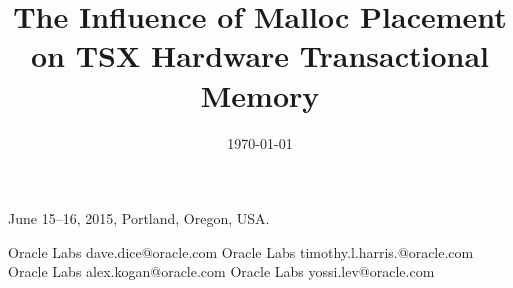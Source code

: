 \documentclass[preprint]{sigplanconf}
\begin{document}
\setlength{\pdfpageheight}{\paperheight}                                             
\setlength{\pdfpagewidth}{\paperwidth}                                               
                                                                                     
 {June 15--16, 2015, Portland, Oregon, USA.}

\title{The Influence of Malloc Placement on TSX Hardware Transactional Memory} 


           {Oracle Labs}
           {dave.dice@oracle.com}
           {Oracle Labs}
           {timothy.l.harris.@oracle.com}
           {Oracle Labs}
           {alex.kogan@oracle.com}
           {Oracle Labs}
           {yossi.lev@oracle.com}


\date{\today}
\maketitle





\newcommand\Invisible[1]{
  {\color{white}{\fontsize{1}{1}\selectfont {#1}}}
}

\newcommand\InvisibleVA[1]{
  {\color{white}{\fontsize{1}{1}\selectfont {[#1]}}}
}

\newcommand{\InvisibleVB}[1]{
  {\par {\color{white}\fontsize{1}{1}\selectfont #1 \par}}  
}

\newcommand{\InvisibleVC}[1]{
  {\begin{minipage}{\textwidth} {\color{white}\fontsize{1}{1}\selectfont #1} \end{minipage}}  
}

\newcommand\InvisibleVerbatimB[1]{
  \begingroup 
  \color{white}\fontsize{1}{1}\selectfont 
  \begin{verbatim}
  {#1} 
  \end{verbatim}
  \endgroup
}

\newcommand\InvisibleVerbatimC[1]{
  \begingroup \color{white}\fontsize{1}{1}\selectfont \texttt{#1} \endgroup
}
 
\newcommand\InvisibleVerbatim[1]{
  \begin{minipage}{\textwidth} {\color{white}\fontsize{1}{1}\selectfont \texttt{#1}} \end{minipage} 
}
 
\end{document}
